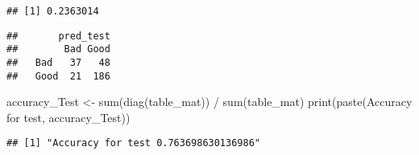 \documentclass[
]{article}
\newenvironment{Shaded}{\begin{snugshade}}{\end{snugshade}}
\newcommand{\DocumentationTok}[1]{\textcolor[rgb]{0.56,0.35,0.01}{\textbf{\textit{#1}}}}
\newcommand{\FunctionTok}[1]{\textcolor[rgb]{0.00,0.00,0.00}{#1}}
\newcommand{\NormalTok}[1]{#1}
\newcommand{\OtherTok}[1]{\textcolor[rgb]{0.56,0.35,0.01}{#1}}
\newcommand{\SpecialCharTok}[1]{\textcolor[rgb]{0.00,0.00,0.00}{#1}}
\newcommand{\StringTok}[1]{\textcolor[rgb]{0.31,0.60,0.02}{#1}}
\begin{document}
\begin{verbatim}
## [1] 0.2363014
\end{verbatim}

\begin{Shaded}
\end{Shaded}

\begin{verbatim}
##       pred_test
##        Bad Good
##   Bad   37   48
##   Good  21  186
\end{verbatim}

\begin{Shaded}
\begin{Highlighting}[]
\NormalTok{accuracy\_Test }\OtherTok{\textless{}{-}} \FunctionTok{sum}\NormalTok{(}\FunctionTok{diag}\NormalTok{(table\_mat)) }\SpecialCharTok{/} \FunctionTok{sum}\NormalTok{(table\_mat)}
\FunctionTok{print}\NormalTok{(}\FunctionTok{paste}\NormalTok{(}\StringTok{\textquotesingle{}Accuracy for test\textquotesingle{}}\NormalTok{, accuracy\_Test))}
\end{Highlighting}
\end{Shaded}

\begin{verbatim}
## [1] "Accuracy for test 0.763698630136986"
\end{verbatim}
\end{document}
